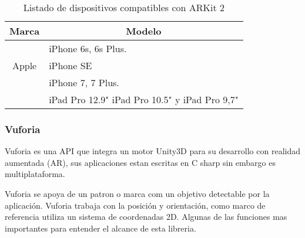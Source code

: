 \clearpage
\begin{table}[]
	\begin{tabular}{|c|l|}
		\hline
		\textbf{Marca}              & \multicolumn{1}{c|}{\textbf{Modelo}}               \\ \hline
		\multirow{3}{*}{Apple}       & iPhone 6s, 6s Plus.      \\ \cline{2-2} 
		& iPhone SE								                \\ \cline{2-2} 
		& iPhone 7,  7 Plus.     				                \\ \cline{2-2} 
		& iPad Pro 12.9" iPad Pro 10.5" y iPad Pro 9,7"             \\ \hline
	\end{tabular}
	\captionsetup{justification=centering}
	\caption{Listado de dispositivos compatibles con ARKit 2}
\end{table}
\noindent
\subsubsection{Vuforia}
Vuforia es una API que integra un motor Unity3D para su desarrollo con realidad aumentada (AR), sus aplicaciones estan escritas en C sharp sin embargo es multiplataforma.\par
Vuforia se apoya de un patron o marca com un objetivo detectable por la aplicación. Vuforia trabaja con la posición y orientación, como marco de referencia utiliza un sistema de coordenadas 2D. Algunas de las funciones mas importantes para entender el alcance de esta libreria. \cite{B12} 


